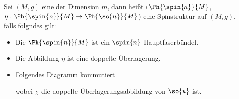 \begin{Def}[Spinstruktur]
	Sei $(M,g)$ eine \RMF der Dimension $m$, dann heißt
	 ($\Ph{\spin{n}}{M}$,$\eta : \Ph{\spin{n}}{M} \rightarrow \Ph{\so{n}}{M}$) eine Spinstruktur auf $(M,g)$, falls folgndes gilt:
	 \begin{itemize}
	 	\item Die \mfg $\Ph{\spin{n}}{M}$ ist ein $\spin{n}$ Hauptfaserbündel.
	 	\item Die Abbildung $\eta$ ist eine doppelte Überlagerung.
	 	\item Folgendes Diagramm kommutiert\\
		 	\begin{center}
			 \end{center}
			wobei $\chi$ die doppelte Überlagerungsabbildung von $\so{n}$ ist.
	 \end{itemize}
	
	

\end{Def}



